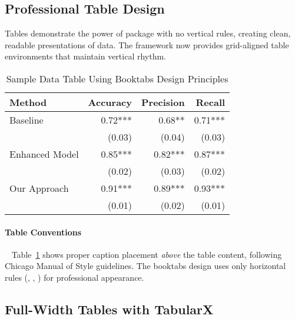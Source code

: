 \documentclass[11pt]{article}
\begin{document}
\subsection{Professional Table Design}

Tables demonstrate the power of  package with no vertical rules, creating clean, readable presentations of data. The framework now provides grid-aligned table environments that maintain vertical rhythm.

\begin{table}[tbp]
  \caption{Sample Data Table Using Booktabs Design Principles}
  \label{tab:sample-data}
  \centering
  \begin{tabular}{@{}lrrr@{}}
    \toprule
    Method & Accuracy & Precision & Recall \\
    \midrule
    Baseline & 0.72*** & 0.68** & 0.71*** \\
                & (0.03) & (0.04) & (0.03) \\
    Enhanced Model & 0.85*** & 0.82*** & 0.87*** \\
                   & (0.02) & (0.03) & (0.02) \\
    Our Approach & 0.91*** & 0.89*** & 0.93*** \\
                 & (0.01) & (0.02) & (0.01) \\
    \bottomrule
  \end{tabular}
  \begin{tablenotes}
    \tabstars
  \end{tablenotes}
\end{table}

\paragraph{Table Conventions}~ Table~\ref{tab:sample-data} shows proper caption placement \emph{above} the table content, following Chicago Manual of Style guidelines. The booktabs design uses only horizontal rules (, , ) for professional appearance.

\subsection{Full-Width Tables with TabularX}
\end{document}
